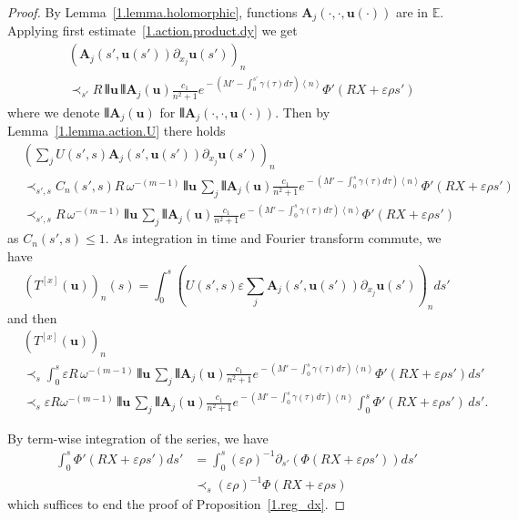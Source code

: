 \documentclass[AHL,Unicode,longabstracts,published]{cedram}
\theoremstyle{plain}
\newcommand*\e{\varepsilon}
\newcommand{\dptl}{\partial}%
\newcommand*\EE{{\mathbb E}}
\newcommand*\g{\gamma}
\newcommand{\ubf}{{\mathbf u}}
\newcommand*\A{{\mathbf A}}
\newcommand*\dsp{\displaystyle}
\DeclarePairedDelimiter{\VERT}{|\mkern -1.6mu|\mkern -1.6mu|}{|\mkern -1.6mu|\mkern -1.6mu|}
\begin{document}
\begin{proof}
By Lemma~\ref{1.lemma.holomorphic}, functions ${\mathbf A}_j(\cdot,\cdot, \ubf(\cdot))$ are in $\EE$. Applying first estimate~\eqref{1.action.product.dy} we get
\begin{align*}
& \left(\A_j(s',\ubf(s')) \dptl_{x_j}\ubf(s')\right)_n \\
& \prec_{s'} R \,\VERT{\ubf}\, \VERT{\A_j(\ubf)}
\frac{\dsp c_1}{\dsp n^2+1} e^{{}- (M'- \int_{0}^{s'}\g(\tau)d\tau) \left<n\right>} \Phi'\left(R X+\e\rho s'\right)
\end{align*}
where we denote $\VERT{\A_j(\ubf)}$ for $\VERT{\A_j(\cdot,\cdot, \ubf(\cdot))}$. Then by Lemma~\ref{1.lemma.action.U} there holds
\begin{align*}
& \left(\sum_j U(s',s) \A_j(s',\ubf(s')) \dptl_{x_j}\ubf(s') \right)_n \\
& \prec_{s',s} C_n(s',s) R \,\omega^{-(m-1)}\,\VERT{\ubf}\, \sum_j\VERT{\A_j(\ubf)} \frac{\dsp c_1}{\dsp n^2+1}e^{{}- (M'- \int_{0}^{s}\g(\tau)d\tau) \left<n\right>} \Phi'\left(R X+\e\rho s'\right) \\
& \prec_{s',s} R \,\omega^{-(m-1)}\,\VERT{\ubf}\, \sum_j\VERT{\A_j(\ubf)} \frac{\dsp c_1}{\dsp n^2+1}e^{{}- (M'- \int_{0}^{s}\g(\tau)d\tau) \left<n\right>} \Phi'\left(R X+\e\rho s'\right)
\end{align*}
as $C_n(s',s) \leq 1$. As integration in time and Fourier transform commute, we have
\[
\left(T^{[x]}(\ubf)\right)_n(s) = \int_{0}^{s} \left(U(s',s) \e \sum_j\A_j(s', \ubf(s')) \dptl_{x_j}\ubf(s')\right)_n ds'
\]
and then
\begin{align*}
& \left(T^{[x]}(\ubf)\right)_n \\
& \prec_{s} \int_{0}^{s} \e R \,\omega^{-(m-1)}\,\VERT{\ubf}\, \sum_j\VERT{\A_j(\ubf)} \frac{\dsp c_1}{\dsp n^2+1}e^{{}- (M'- \int_{0}^{s}\g(\tau)d\tau) \left<n\right>} \Phi'\left(R X+\e\rho s'\right) ds' \\
& \prec_{s} \e R\omega^{-(m-1)}\,\VERT{\ubf}\, \sum_j\VERT{\A_j(\ubf)} \frac{\dsp c_1}{\dsp n^2+1}e^{{}- (M'- \int_{0}^{s}\g(\tau)d\tau) \left<n\right>} \int_{0}^{s} \Phi'\left(R X+\e\rho s'\right) \, ds'.
\end{align*}

By term-wise integration of the series, we have
\begin{align*}
\int_{0}^{s} \Phi'\left(RX+\e\rho s'\right) ds' & = \int_{0}^{s} (\e\rho)^{-1} \dptl_{s'} \left(\Phi\left(R X+\e\rho s'\right) \right)ds' \\
& \prec_{s} (\e\rho)^{-1} \Phi\left(R X+\e\rho s\right)
\end{align*}
which suffices to end the proof of Proposition~\ref{1.reg_dx}.
\end{proof}
\end{document}

